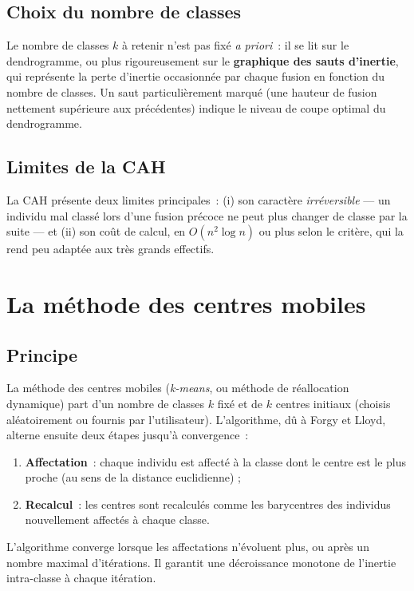\documentclass[11pt,a4paper,oneside]{book}
\begin{document}
\subsection{Choix du nombre de classes}
Le nombre de classes $k$ à retenir n'est pas fixé \emph{a priori}~: il se lit sur le dendrogramme, ou plus rigoureusement sur le \textbf{graphique des sauts d'inertie}, qui représente la perte d'inertie occasionnée par chaque fusion en fonction du nombre de classes. Un saut particulièrement marqué (une hauteur de fusion nettement supérieure aux précédentes) indique le niveau de coupe optimal du dendrogramme.

\subsection{Limites de la CAH}
La CAH présente deux limites principales~: (i) son caractère \emph{irréversible} --- un individu mal classé lors d'une fusion précoce ne peut plus changer de classe par la suite --- et (ii) son coût de calcul, en $O(n^2 \log n)$ ou plus selon le critère, qui la rend peu adaptée aux très grands effectifs.

\section{La méthode des centres mobiles}

\subsection{Principe}
La méthode des centres mobiles (\emph{k-means}, ou méthode de réallocation dynamique) part d'un nombre de classes $k$ fixé et de $k$ centres initiaux (choisis aléatoirement ou fournis par l'utilisateur). L'algorithme, dû à Forgy et Lloyd, alterne ensuite deux étapes jusqu'à convergence~:
\begin{enumerate}
  \item \textbf{Affectation}~: chaque individu est affecté à la classe dont le centre est le plus proche (au sens de la distance euclidienne) ;
  \item \textbf{Recalcul}~: les centres sont recalculés comme les barycentres des individus nouvellement affectés à chaque classe.
\end{enumerate}
L'algorithme converge lorsque les affectations n'évoluent plus, ou après un nombre maximal d'itérations. Il garantit une décroissance monotone de l'inertie intra-classe à chaque itération.
\end{document}
